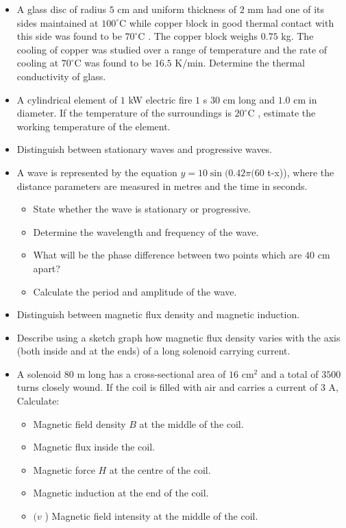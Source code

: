 \documentclass{article}
\begin{document}
\begin{itemize}
\item A glass disc of radius $ 5$ cm and uniform thickness of $ 2$ mm had one of its sides maintained at $ 100^{\circ}$C while copper block in good thermal contact with this side was found to be $ 70^{\circ}$C . The copper block weighs $ 0.75$ kg. The cooling of copper was studied over a range of temperature and the rate of cooling at $ 70^{\circ}$C was found to be $ 16.5$ K$/$min. Determine the thermal conductivity of glass.
\item A cylindrical element of $ 1$ kW electric fire $ 1$ s $ 30$ cm long and $ 1.0$ cm in  diameter. If the temperature of the surroundings is $ 20^{\circ}$C , estimate the working temperature of the element.
\item Distinguish between stationary waves and progressive waves.
\item A wave is represented by the equation $ y=10 \sin(0.42\pi(60$ t-x)), where the distance parameters are measured in metres and the time in seconds.
 \begin{itemize}
\item State whether the wave is stationary or progressive.
\item Determine the wavelength and frequency of the wave.
\item What will be the phase difference between two points which are $ 40$ cm apart? 
\item Calculate the period and amplitude of the wave. 
\end{itemize}
\item Distinguish between magnetic flux density and magnetic induction.
\item Describe using a sketch graph how magnetic flux density varies with the axis (both inside and at the ends) of a long solenoid carrying current. 
\item A solenoid $ 80$ m long has a cross-sectional area of $ 16$ cm$ ^{2}$ and a total of $ 3500$ turns closely wound. If the coil is filled with air and carries a current of $ 3$ A, Calculate:
 \begin{itemize}
\item Magnetic field density $ B$ at the middle of the coil.
\item Magnetic flux inside the coil. 
\item Magnetic force $ H$ at the centre of the coil. 
\item Magnetic induction at the end of the coil.
\item $ (v$ ) Magnetic field intensity at the middle of the coil. 

\end{itemize}
\end{itemize}
\end{document}
